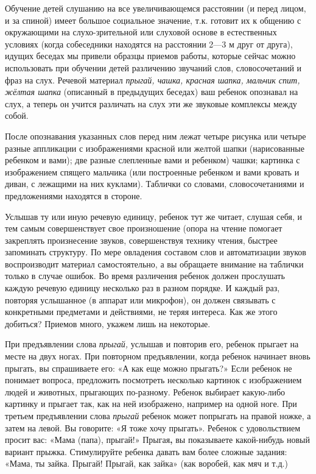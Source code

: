\documentclass{book}
\renewcommand{\emph}[1]{\textit{#1}}
\begin{document}
Обучение детей слушанию на все увеличивающемся расстоянии (и перед
лицом, и за спиной) имеет большое социальное значение, т.к. готовит их к
общению с окружающими на слухо-зрительной или слуховой основе в
естественных условиях (когда собеседники находятся на расстоянии 2---3 м
друг от друга), идущих беседах мы привели образцы приемов работы,
которые сейчас можно использовать при обучении детей различению звучаний
слов, словосочетаний и фраз на слух. Речевой материал \emph{прыгай,
чашка, красная шапка, мальчик спит, жёлтая шапка} (описанный в
предыдущих беседах) ваш ребенок опознавал на слух, а теперь он учится
различать на слух эти же звуковые комплексы между собой.

После опознавания указанных слов перед ним лежат четыре рисунка или
четыре разные аппликации с изображениями красной или желтой шапки
(нарисованные ребенком и вами); две разные слепленные вами и ребенком)
чашки; картинка с изображением спящего мальчика (или построенные
ребенком и вами кровать и диван, с лежащими на них куклами). Таблички со
словами, словосочетаниями и предложениями находятся в стороне.

Услышав ту или иную речевую единицу, ребенок тут же читает, слушая себя,
и тем самым совершенствует свое произношение (опора на чтение помогает
закреплять произнесение звуков, совершенствуя технику чтения, быстрее
запоминать структуру. По мере овладения составом слов и автоматизации
звуков воспроизводит материал самостоятельно, а вы обращаете внимание на
таблички только в случае ошибок. Во время различения ребенок должен
прослушать каждую речевую единицу несколько раз в разном порядке. И
каждый раз, повторяя услышанное (в аппарат или микрофон), он должен
связывать с конкретными предметами и действиями, не теряя интереса. Как
же этого добиться? Приемов много, укажем лишь на некоторые.

При предъявлении слова \emph{прыгай,} услышав и повторив его, ребенок
прыгает на месте на двух ногах. При повторном предъявлении, когда
ребенок начинает вновь прыгать, вы спрашиваете его: «А как еще можно
прыгать?» Если ребенок не понимает вопроса, предложить посмотреть
несколько картинок с изображением людей и животных, прыгающих
по-разному. Ребенок выбирает какую-либо картинку и прыгает так, как на
ней изображено, например на одной ноге. При третьем предъявлении слова
\emph{прыгай} ребенок может попрыгать на правой ножке, а затем на левой.
Вы говорите: «Я тоже хочу прыгать». Ребенок с удовольствием просит вас:
«Мама (папа), прыгай!» Прыгая\textbf{,} вы показываете какой-нибудь
новый вариант прыжка. Стимулируйте ребенка давать вам более сложные
задания: «Мама, ты зайка. Прыгай! Прыгай, как зайка» (как воробей, как
мяч и т.д.)
\end{document}
